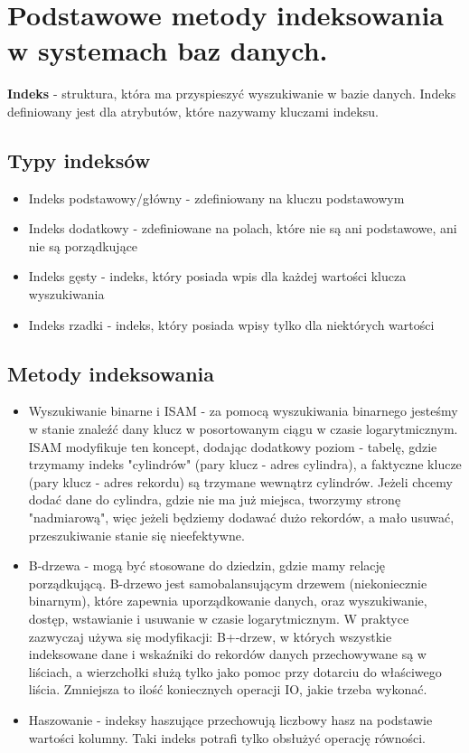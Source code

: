 \section{Podstawowe metody indeksowania w systemach baz danych.}

\textbf{Indeks} - struktura, która ma przyspieszyć wyszukiwanie w bazie danych.
Indeks definiowany jest dla atrybutów, które nazywamy kluczami indeksu.

\subsection{Typy indeksów}
\begin{itemize}[itemsep=0pt,partopsep=0pt, parsep=0pt]
    \item Indeks podstawowy/główny - zdefiniowany na kluczu podstawowym
    \item Indeks dodatkowy - zdefiniowane na polach, które nie są ani podstawowe, ani nie są porządkujące
    \item Indeks gęsty - indeks, który posiada wpis dla każdej wartości klucza wyszukiwania
    \item Indeks rzadki - indeks, który posiada wpisy tylko dla niektórych wartości
\end{itemize}

\subsection{Metody indeksowania}
\begin{itemize}[itemsep=0pt,partopsep=0pt, parsep=0pt]
    \item Wyszukiwanie binarne i ISAM - za pomocą wyszukiwania binarnego jesteśmy w stanie znaleźć dany klucz
    w posortowanym ciągu w czasie logarytmicznym.
    ISAM modyfikuje ten koncept, dodając dodatkowy poziom - tabelę, gdzie trzymamy indeks "cylindrów"
    (pary klucz - adres cylindra),
    a faktyczne klucze (pary klucz - adres rekordu) są trzymane wewnątrz cylindrów.
    Jeżeli chcemy dodać dane do cylindra, gdzie nie ma już miejsca, tworzymy stronę "nadmiarową",
    więc jeżeli będziemy dodawać dużo rekordów, a mało usuwać, przeszukiwanie stanie się nieefektywne.
    \item B-drzewa - mogą być stosowane do dziedzin, gdzie mamy relację porządkującą.
    B-drzewo jest samobalansującym drzewem (niekoniecznie binarnym), które zapewnia uporządkowanie danych,
    oraz wyszukiwanie, dostęp, wstawianie i usuwanie w czasie logarytmicznym.
    W praktyce zazwyczaj używa się modyfikacji: B+-drzew,
    w których wszystkie indeksowane dane i wskaźniki do rekordów danych przechowywane są w liściach,
    a wierzchołki służą tylko jako pomoc przy dotarciu do właściwego liścia.
    Zmniejsza to ilość koniecznych operacji IO, jakie trzeba wykonać.
    \item Haszowanie - indeksy haszujące przechowują liczbowy hasz na podstawie wartości kolumny.
    Taki indeks potrafi tylko obsłużyć operację równości.
\end{itemize}
